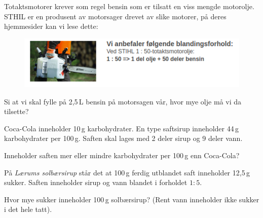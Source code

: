 Totaktsmotorer krever som regel bensin som er tilsatt en viss mengde motorolje. STHIL er en produsent av motorsager drevet av slike motorer, på deres hjemmesider kan vi lese dette:
\begin{figure}
	\includegraphics[]{stihl}
\end{figure}
Si at vi skal fylle på 2,5\,L bensin på motorsagen vår, hvor mye olje må vi da tilsette?

\vsk \vspace{12pt}

Coca-Cola inneholder 10\,g karbohydrater. En type saftsirup inneholder 44\,g karbohydrater per 100\,g. Saften skal lages med 2 deler sirup og 9 deler vann. \os

Inneholder saften mer eller mindre karbohydrater per 100\,g enn Coca-Cola?

På \textsl{Lærums solbærsirup} står det at 100\,g ferdig utblandet saft inneholder 12,5\,g sukker. Saften inneholder sirup og vann blandet i forholdet $ {1:5} $. \os

Hvor mye sukker inneholder 100\,g solbærsirup? (Rent vann inneholder ikke sukker i det hele tatt).


